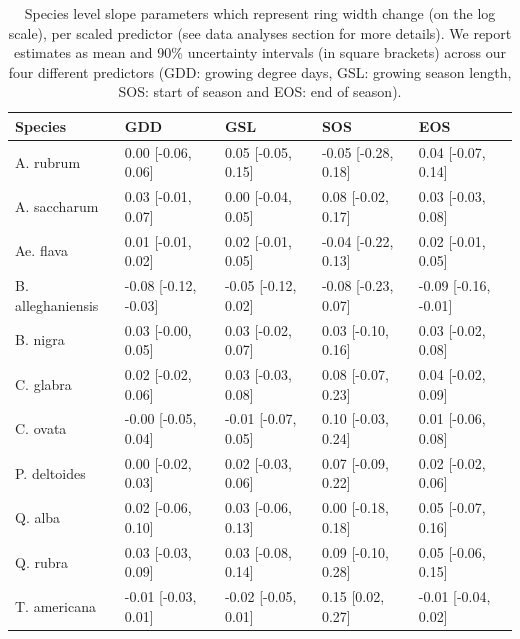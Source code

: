 \begin{table}[ht]
\centering
\caption{Species level slope parameters which represent ring width change (on the log scale), per scaled predictor (see data analyses section for more details). We report estimates as mean and 90\% uncertainty intervals (in square brackets) across our four different predictors (GDD: growing degree days, GSL: growing season length, SOS: start of season and EOS: end of season).} 
\label{tab:ts_slope_table}
\begin{tabular}{lllll}
  \hline
Species & GDD & GSL & SOS & EOS \\ 
  \hline
A. rubrum & 0.00 [-0.06, 0.06] & 0.05 [-0.05, 0.15] & -0.05 [-0.28, 0.18] & 0.04 [-0.07, 0.14] \\ 
  A. saccharum & 0.03 [-0.01, 0.07] & 0.00 [-0.04, 0.05] & 0.08 [-0.02, 0.17] & 0.03 [-0.03, 0.08] \\ 
  Ae. flava & 0.01 [-0.01, 0.02] & 0.02 [-0.01, 0.05] & -0.04 [-0.22, 0.13] & 0.02 [-0.01, 0.05] \\ 
  B. alleghaniensis & -0.08 [-0.12, -0.03] & -0.05 [-0.12, 0.02] & -0.08 [-0.23, 0.07] & -0.09 [-0.16, -0.01] \\ 
  B. nigra & 0.03 [-0.00, 0.05] & 0.03 [-0.02, 0.07] & 0.03 [-0.10, 0.16] & 0.03 [-0.02, 0.08] \\ 
  C. glabra & 0.02 [-0.02, 0.06] & 0.03 [-0.03, 0.08] & 0.08 [-0.07, 0.23] & 0.04 [-0.02, 0.09] \\ 
  C. ovata & -0.00 [-0.05, 0.04] & -0.01 [-0.07, 0.05] & 0.10 [-0.03, 0.24] & 0.01 [-0.06, 0.08] \\ 
  P. deltoides & 0.00 [-0.02, 0.03] & 0.02 [-0.03, 0.06] & 0.07 [-0.09, 0.22] & 0.02 [-0.02, 0.06] \\ 
  Q. alba & 0.02 [-0.06, 0.10] & 0.03 [-0.06, 0.13] & 0.00 [-0.18, 0.18] & 0.05 [-0.07, 0.16] \\ 
  Q. rubra & 0.03 [-0.03, 0.09] & 0.03 [-0.08, 0.14] & 0.09 [-0.10, 0.28] & 0.05 [-0.06, 0.15] \\ 
  T. americana & -0.01 [-0.03, 0.01] & -0.02 [-0.05, 0.01] & 0.15 [0.02, 0.27] & -0.01 [-0.04, 0.02] \\ 
   \hline
\end{tabular}
\end{table}



